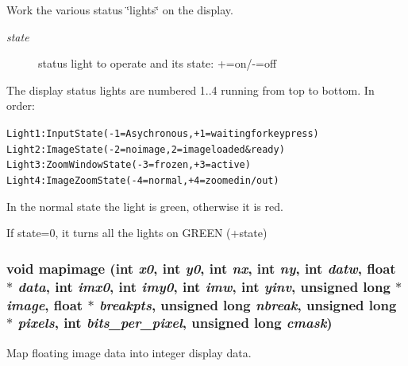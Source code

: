 Work the various status \char`\"{}lights\char`\"{} on the display. 

\begin{Desc}
\item[Parameters:]
\begin{description}
\item[{\em state}]status light to operate and its state: +=on/-=off\end{description}
\end{Desc}
The display status lights are numbered 1..4 running from top to bottom. In order: \small\begin{alltt}
  Light 1: Input State (-1=Asychronous, +1=waiting for key press)
  Light 2: Image State (-2=no image, 2=image loaded \& ready)
  Light 3: Zoom Window State (-3=frozen, +3=active)
  Light 4: Image Zoom State (-4 = normal, +4=zoomed in/out)
  \end{alltt}\normalsize 
 In the normal state the light is green, otherwise it is red.

If state=0, it turns all the lights on GREEN (+state) 
\subsubsection{\setlength{\rightskip}{0pt plus 5cm}void mapimage (int {\em x0}, int {\em y0}, int {\em nx}, int {\em ny}, int {\em datw}, float $\ast$ {\em data}, int {\em imx0}, int {\em imy0}, int {\em imw}, int {\em yinv}, unsigned long $\ast$ {\em image}, float $\ast$ {\em breakpts}, unsigned long {\em nbreak}, unsigned long $\ast$ {\em pixels}, int {\em bits\_\-per\_\-pixel}, unsigned long {\em cmask})}\label{xtv_8h_a119}


Map floating image data into integer display data. 

